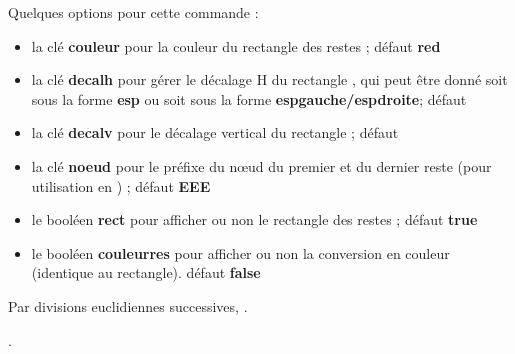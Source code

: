 \documentclass{article}
\newcommand\Cle[1]{{\bfseries\sffamily\textlangle #1\textrangle}}
\begin{document}
\begin{codetex}
\end{codetex}

\begin{codecles}
Quelques options pour cette commande :

\begin{itemize}
	\item la clé \Cle{couleur} pour la couleur du \og rectangle \fg{} des restes ; \hfill{}défaut \Cle{red}
	\item la clé \Cle{decalh} pour gérer le décalage H du \og rectangle \fg{}, qui peut être donné soit sous la forme \Cle{esp} ou soit sous la forme \Cle{espgauche/espdroite}; \hfill{}défaut \Cle{2pt}
	\item la clé \Cle{decalv} pour le décalage vertical du \og rectangle \fg{} ; \hfill{}défaut \Cle{3pt}
	\item la clé \Cle{noeud} pour le préfixe du nœud du premier et du dernier reste (pour utilisation en \TikZ) ; \hfill{}défaut \Cle{EEE}
	\item le booléen \Cle{rect} pour afficher ou non le \og rectangle \fg{} des restes ; \hfill{}défaut \Cle{true}
	\item le booléen \Cle{couleurres} pour afficher ou non la conversion en couleur (identique au rectangle). \hfill{}défaut \Cle{false}
\end{itemize}
\end{codecles}

\begin{codetex}

Par divisions euclidiennes successives, .


.
\end{codetex}
\end{document}
